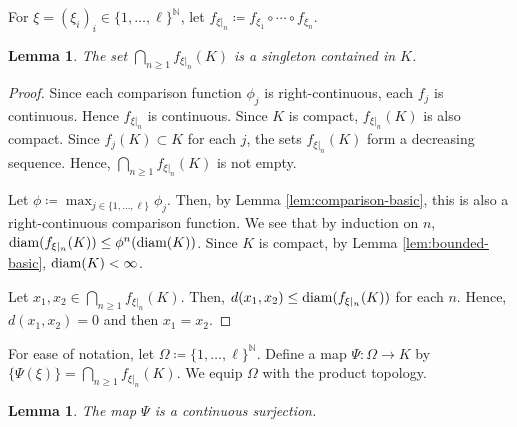 \documentclass[a4paper, reqno, 11pt]{amsart}
\newtheorem{Lem}[Thm]{Lemma}
\theoremstyle{definition}
\begin{document}
For $\xi = (\xi_i)_i \in \{1, \dots, \ell\}^{\mathbb N}$, 
let  $f_{\xi|_{n}} \coloneqq f_{\xi_1} \circ \cdots \circ f_{\xi_n}$. 

\begin{Lem}
The set $\bigcap_{n \ge 1} f_{\xi|_{n}}(K)$ is a singleton contained in $K$. 
\end{Lem}

\begin{proof}
Since each comparison function $\phi_j$ is right-continuous, each $f_j$ is continuous. 
Hence $f_{\xi|_{n}}$ is continuous. 
Since $K$ is compact, $f_{\xi|_{n}}(K)$ is also compact. 
Since $f_j (K) \subset K$ for each $j$, the sets $f_{\xi|_{n}}(K)$ form a decreasing sequence. 
Hence, $\bigcap_{n \ge 1}  f_{\xi|_{n}}(K)$ is not empty. 

Let $\phi \coloneqq \max_{j \in \{1, \dots, \ell\}} \phi_j$. 
Then, by Lemma \ref{lem:comparison-basic}, this is also a right-continuous comparison function. 
We see that by induction on $n$, 
$\textup{diam}( f_{\xi|_{n}}(K)) \le \phi^n (\textup{diam}(K))$. 
Since $K$ is compact, by Lemma \ref{lem:bounded-basic}, $\textup{diam}(K) < \infty$.  
 
Let $x_1, x_2 \in \bigcap_{n \ge 1}  f_{\xi|_{n}}(K)$. 
Then, $d(x_1, x_2) \le \textup{diam}( f_{\xi|_{n}}(K))$ for each $n$. 
Hence, $d(x_1, x_2) = 0$ and then $x_1 = x_2$. 
\end{proof}

For ease of notation, let $\Omega \coloneqq \{1, \dots, \ell\}^{\mathbb N}$. 
Define a map $\Psi \colon \Omega \to K$ by $\{\Psi(\xi)\} = \bigcap_{n \ge 1} f_{\xi|_{n}}(K)$.  
We equip $\Omega$ with the product topology. 

\begin{Lem}\label{lem:conti-surj}
The map $\Psi$ is a continuous surjection. 
\end{Lem}
\end{document}
